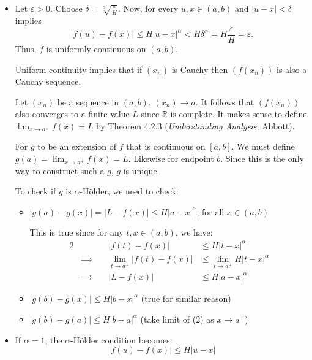 \begin{solution}
    \begin{itemize}
        \item[(a)]
              Let $\varepsilon > 0$. Choose $\delta = \sqrt[\alpha]{\frac{\varepsilon}{H}}$. Now, for every $u, x \in (a, b)$ and $|u - x| < \delta$ implies
              \[
                  |f(u) - f(x)| \leq H|u - x|^\alpha < H\delta^\alpha = H \frac{\varepsilon}{H} = \varepsilon.
              \]
              Thus, $f$ is uniformly continuous on $(a, b)$.

              \begin{remark}{}
                  Uniform continuity implies that if $(x_n)$ is Cauchy then $(f(x_n))$ is also a Cauchy sequence.
              \end{remark}

              Let $(x_n)$ be a sequence in $(a, b)$, $(x_n) \to a$. It follows that $(f(x_n))$ also converges
              to a finite value $L$ since $\mathbb{R}$ is complete. It makes sense to define $\lim_{x \to a^+} f(x) = L$
              by Theorem 4.2.3 (\textit{Understanding Analysis}, Abbott).

              For $g$ to be an extension of $f$ that is continuous on $[a, b]$. We must define
              $g(a) = \lim_{x \to a^+} f(x) = L$. Likewise for endpoint $b$. Since this is the
              only way to construct such a $g$, $g$ is unique.

              To check if $g$ is $\alpha$-Hölder, we need to check:
              \begin{itemize}
                  \item[(1):] $|g(a) - g(x)| = |L - f(x)| \leq H|a - x|^\alpha$, for all $x \in (a, b)$

                        This is true since for any $t, x \in (a, b)$, we have:
                        \begin{alignat*}{2}
                             &                & |f(t) - f(x)|                  & \leq H|t - x|^\alpha                  \\
                             & \implies \quad & \lim_{t \to a^+} |f(t) - f(x)| & \leq \lim_{t \to a^+} H|t - x|^\alpha \\
                             & \implies \quad & |L - f(x)|                     & \leq H|a - x|^\alpha
                        \end{alignat*}

                  \item[(2):] $|g(b) - g(x)| \leq H|b - x|^\alpha$ \quad (true for similar reason)
                  \item[(3):] $|g(b) - g(a)| \leq H|b - a|^\alpha$ \quad (take limit of (2) as $x \to a^+$)
              \end{itemize}
        \item[(b)]
              If $\alpha = 1$, the $\alpha$-Hölder condition becomes:
              $$ |f(u) - f(x)| \le H|u - x| $$


\end{itemize}
\end{solution}
